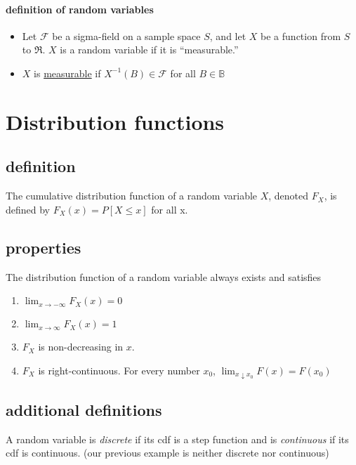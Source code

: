 \paragraph{definition of random variables}

\begin{itemize}
\item Let $\mathcal{F}$ be a sigma-field on a sample space $S$, and
        let $X$ be a function from $S$ to $\Re$.  $X$ is a random
        variable if it is ``measurable.''
\item $X$ is \underline{measurable} if $X^{-1}(B) \in \mathcal{F}$ for all $B
        \in \mathbb{B}$
\end{itemize}

\section{Distribution functions}

\subsection{definition}

     The cumulative distribution function of a random variable $X$,
     denoted $F_X$, is defined by $F_X(x) = P[X \leq x]$ for all x.

\subsection{properties}

     The distribution function of a random variable always exists and
     satisfies
\begin{enumerate}
\item $\lim_{x \to -\infty} F_X(x) = 0$
\item $\lim_{x \to \infty} F_X(x) = 1$
\item $F_X$ is non-decreasing in $x$.
\item $F_X$ is right-continuous.  For every number $x_0$, $\lim_{x
        \downarrow x_0} F(x) = F(x_0)$
\end{enumerate}

\subsection{additional definitions}

     A random variable is \emph{discrete} if its cdf is a step function and
     is \emph{continuous} if its cdf is continuous.  (our previous example is
     neither discrete nor continuous)

